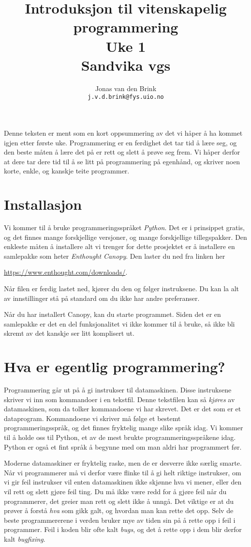 \documentclass[a4paper, 11pt, notitlepage]{article}
\author{Jonas van den Brink \\ \texttt{j.v.d.brink@fys.uio.no}}
\title{Introduksjon til vitenskapelig programmering \\ Uke 1 \\ Sandvika vgs}
\begin{document}
\maketitle

Denne teksten er ment som en kort oppsummering av det vi håper å ha kommet igjen etter første uke. Programmering er en ferdighet det tar tid å lære seg, og den beste måten å lære det på er rett og slett å prøve seg frem. Vi håper derfor at dere tar dere tid til å se litt på programmering på egenhånd, og skriver noen korte, enkle, og kanskje teite programmer.

\section*{Installasjon}

Vi kommer til å bruke programmeringsspråket \emph{Python}. Det er i prinsippet gratis, og det finnes mange forskjellige versjoner, og mange forskjellige tillegspakker. Den enkleste måten å installere alt vi trenger for dette prosjektet er å installere en samlepakke som heter \emph{Enthought Canopy}. Den laster du ned fra linken her

\hspace{2cm}\url{https://www.enthought.com/downloads/}.

Når filen er ferdig lastet ned, kjører du den og følger instruksene. Du kan la alt av innstillinger stå på standard om du ikke har andre preferanser.

Når du har installert Canopy, kan du starte programmet. Siden det er en samle\-pakke er det en del funksjonalitet vi ikke kommer til å bruke, så ikke bli skremt av det kanskje ser litt komplisert ut.

\section*{Hva er egentlig programmering?}

Programmering går ut på å gi instrukser til datamaskinen. Disse instruksene skriver vi inn som kommandoer i en tekstfil. Denne tekstfilen kan så \emph{kjøres} av datamaskinen, som da tolker kommandoene vi har skrevet. Det er det som er et dataprogram. Kommandoene vi skriver må følge et bestemt programmeringsspråk, og det finnes fryktelig mange slike språk idag. Vi kommer til å holde oss til Python, et av de mest brukte programmeringsspråkene idag. Python er også et fint språk å begynne med om man aldri har programmert før.

Moderne datamaskiner er fryktelig raske, men de er desverre ikke særlig smarte. Når vi programmerer må vi derfor være flinke til å gi helt riktige instrukser, om vi gir feil instrukser vil enten datamaskinen ikke skjønne hva vi mener, eller den vil rett og slett gjøre feil ting. Du må ikke være redd for å gjøre feil når du programmerer, det greier man rett og slett ikke å unngå. Det viktige er at du prøver å forstå \emph{hva} som gikk galt, og hvordan man kan rette det opp. Selv de beste programmererene i verden bruker mye av tiden sin på å rette opp i feil i programmer. Feil i koden blir ofte kalt \emph{bugs}, og det å rette opp i dem blir derfor kalt \emph{bugfixing}.
\end{document}
